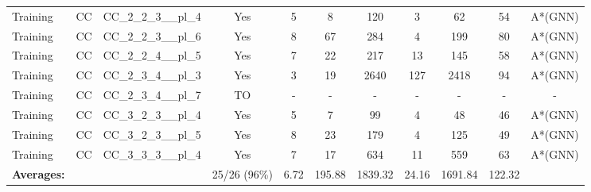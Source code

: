 \documentclass{article}
\begin{document}
\begin{tabular}{lllcccccccc}
Training & CC & CC\_2\_2\_3\_\_pl\_4 & Yes & 5 & 8 & 120 & 3 & 62 & 54 & A*(GNN) \\
Training & CC & CC\_2\_2\_3\_\_pl\_6 & Yes & 8 & 67 & 284 & 4 & 199 & 80 & A*(GNN) \\
Training & CC & CC\_2\_2\_4\_\_pl\_5 & Yes & 7 & 22 & 217 & 13 & 145 & 58 & A*(GNN) \\
Training & CC & CC\_2\_3\_4\_\_pl\_3 & Yes & 3 & 19 & 2640 & 127 & 2418 & 94 & A*(GNN) \\
Training & CC & CC\_2\_3\_4\_\_pl\_7 & TO & - & - & - & - & - & - & - \\
Training & CC & CC\_3\_2\_3\_\_pl\_4 & Yes & 5 & 7 & 99 & 4 & 48 & 46 & A*(GNN) \\
Training & CC & CC\_3\_2\_3\_\_pl\_5 & Yes & 8 & 23 & 179 & 4 & 125 & 49 & A*(GNN) \\
Training & CC & CC\_3\_3\_3\_\_pl\_4 & Yes & 7 & 17 & 634 & 11 & 559 & 63 & A*(GNN) \\
\textbf{Averages:} & & & 25/26 (96\%) & 6.72 & 195.88 & 1839.32 & 24.16 & 1691.84 & 122.32 & \\
\bottomrule
\end{tabular}
\newpage
\end{document}
